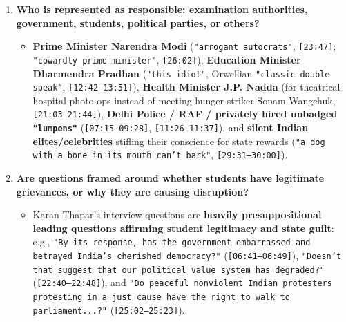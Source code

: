 \documentclass[10pt,a4paper]{article}
\begin{document}
\begin{enumerate}[leftmargin=1.6em, itemsep=4pt, topsep=4pt]
  \begin{itemize}[leftmargin=1.4em, itemsep=2pt, topsep=2pt]
    \item Focuses on \textbf{(a) the moral/democratic betrayal of state violence against peaceful youth (\texttt{[06:23--11:55]}), (b) broader syllabus degradation \& ministerial accountability (\texttt{[12:04--14:57]}, \texttt{[19:35--23:37]}), and (c) a scathing character indictment of PM Narendra Modi and authoritarian fear (\texttt{[00:00--02:45]}, \texttt{[15:07--19:01]}, \texttt{[23:47--30:40]})}---explicitly rejecting any disruption frame (\texttt{"It's not as if they were burning effigies or kicking things or destroying stuff"}, \texttt{[25:42--25:51]}).
  \end{itemize}
  \item \textbf{Who is represented as responsible: examination authorities, government, students, political parties, or others?}
  \begin{itemize}[leftmargin=1.4em, itemsep=2pt, topsep=2pt]
    \item \textbf{Prime Minister Narendra Modi} (\texttt{"arrogant autocrats"}, \texttt{[23:47]}; \texttt{"cowardly prime minister"}, \texttt{[26:02]}), \textbf{Education Minister Dharmendra Pradhan} (\texttt{"this idiot"}, Orwellian \texttt{"classic double speak"}, \texttt{[12:42--13:51]}), \textbf{Health Minister J.P. Nadda} (for theatrical hospital photo-ops instead of meeting hunger-striker Sonam Wangchuk, \texttt{[21:03--21:44]}), \textbf{Delhi Police / RAF / privately hired unbadged \texttt{"lumpens"}} (\texttt{[07:15--09:28]}, \texttt{[11:26--11:37]}), and \textbf{silent Indian elites/celebrities} stifling their conscience for state rewards (\texttt{"a dog with a bone in its mouth can't bark"}, \texttt{[29:31--30:00]}).
  \end{itemize}
  \item \textbf{Are questions framed around whether students have legitimate grievances, or why they are causing disruption?}
  \begin{itemize}[leftmargin=1.4em, itemsep=2pt, topsep=2pt]
    \item Karan Thapar's interview questions are \textbf{heavily presuppositional leading questions affirming student legitimacy and state guilt}: e.g., \texttt{"By its response, has the government embarrassed and betrayed India's cherished democracy?"} (\texttt{[06:41--06:49]}), \texttt{"Doesn't that suggest that our political value system has degraded?"} (\texttt{[22:40--22:48]}), and \texttt{"Do peaceful nonviolent Indian protesters protesting in a just cause have the right to walk to parliament...?"} (\texttt{[25:02--25:23]}).

\end{itemize}
\end{enumerate}
\end{document}
